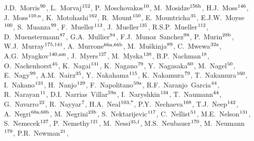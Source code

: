 \begin{flushleft}
J.D.~Morris$^\textrm{\scriptsize 90}$,    
L.~Morvaj$^\textrm{\scriptsize 152}$,    
P.~Moschovakos$^\textrm{\scriptsize 10}$,    
M.~Mosidze$^\textrm{\scriptsize 156b}$,    
H.J.~Moss$^\textrm{\scriptsize 146}$,    
J.~Moss$^\textrm{\scriptsize 150,n}$,    
K.~Motohashi$^\textrm{\scriptsize 162}$,    
R.~Mount$^\textrm{\scriptsize 150}$,    
E.~Mountricha$^\textrm{\scriptsize 35}$,    
E.J.W.~Moyse$^\textrm{\scriptsize 100}$,    
S.~Muanza$^\textrm{\scriptsize 99}$,    
F.~Mueller$^\textrm{\scriptsize 113}$,    
J.~Mueller$^\textrm{\scriptsize 135}$,    
R.S.P.~Mueller$^\textrm{\scriptsize 112}$,    
D.~Muenstermann$^\textrm{\scriptsize 87}$,    
G.A.~Mullier$^\textrm{\scriptsize 94}$,    
F.J.~Munoz~Sanchez$^\textrm{\scriptsize 98}$,    
P.~Murin$^\textrm{\scriptsize 28b}$,    
W.J.~Murray$^\textrm{\scriptsize 175,141}$,    
A.~Murrone$^\textrm{\scriptsize 66a,66b}$,    
M.~Mu\v{s}kinja$^\textrm{\scriptsize 89}$,    
C.~Mwewa$^\textrm{\scriptsize 32a}$,    
A.G.~Myagkov$^\textrm{\scriptsize 140,am}$,    
J.~Myers$^\textrm{\scriptsize 127}$,    
M.~Myska$^\textrm{\scriptsize 138}$,    
B.P.~Nachman$^\textrm{\scriptsize 18}$,    
O.~Nackenhorst$^\textrm{\scriptsize 45}$,    
K.~Nagai$^\textrm{\scriptsize 131}$,    
K.~Nagano$^\textrm{\scriptsize 79}$,    
Y.~Nagasaka$^\textrm{\scriptsize 60}$,    
M.~Nagel$^\textrm{\scriptsize 50}$,    
E.~Nagy$^\textrm{\scriptsize 99}$,    
A.M.~Nairz$^\textrm{\scriptsize 35}$,    
Y.~Nakahama$^\textrm{\scriptsize 115}$,    
K.~Nakamura$^\textrm{\scriptsize 79}$,    
T.~Nakamura$^\textrm{\scriptsize 160}$,    
I.~Nakano$^\textrm{\scriptsize 123}$,    
H.~Nanjo$^\textrm{\scriptsize 129}$,    
F.~Napolitano$^\textrm{\scriptsize 59a}$,    
R.F.~Naranjo~Garcia$^\textrm{\scriptsize 44}$,    
R.~Narayan$^\textrm{\scriptsize 11}$,    
D.I.~Narrias~Villar$^\textrm{\scriptsize 59a}$,    
I.~Naryshkin$^\textrm{\scriptsize 134}$,    
T.~Naumann$^\textrm{\scriptsize 44}$,    
G.~Navarro$^\textrm{\scriptsize 22}$,    
R.~Nayyar$^\textrm{\scriptsize 7}$,    
H.A.~Neal$^\textrm{\scriptsize 103,*}$,    
P.Y.~Nechaeva$^\textrm{\scriptsize 108}$,    
T.J.~Neep$^\textrm{\scriptsize 142}$,    
A.~Negri$^\textrm{\scriptsize 68a,68b}$,    
M.~Negrini$^\textrm{\scriptsize 23b}$,    
S.~Nektarijevic$^\textrm{\scriptsize 117}$,    
C.~Nellist$^\textrm{\scriptsize 51}$,    
M.E.~Nelson$^\textrm{\scriptsize 131}$,    
S.~Nemecek$^\textrm{\scriptsize 137}$,    
P.~Nemethy$^\textrm{\scriptsize 121}$,    
M.~Nessi$^\textrm{\scriptsize 35,f}$,    
M.S.~Neubauer$^\textrm{\scriptsize 170}$,    
M.~Neumann$^\textrm{\scriptsize 179}$,    
P.R.~Newman$^\textrm{\scriptsize 21}$,    

\end{flushleft}
